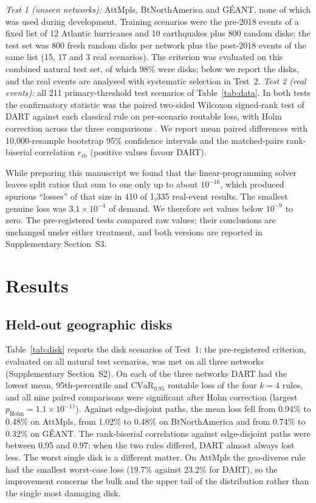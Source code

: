 \documentclass[preprint,12pt]{elsarticle}
\begin{document}
\emph{Test 1 (unseen networks):} AttMpls, BtNorthAmerica and G\'EANT, none of which was used during development. Training scenarios were the pre-2018 events of a fixed list of 12 Atlantic hurricanes and 10 earthquakes plus 800 random disks; the test set was 800 fresh random disks per network plus the post-2018 events of the same list (15, 17 and 3 real scenarios). The criterion was evaluated on this combined natural test set, of which 98\% were disks; below we report the disks, and the real events are analysed with systematic selection in Test~2. \emph{Test 2 (real events):} all 211 primary-threshold test scenarios of Table~\ref{tab:data}. In both tests the confirmatory statistic was the paired two-sided Wilcoxon signed-rank test \cite{wilcoxon45} of DART against each classical rule on per-scenario routable loss, with Holm correction across the three comparisons \cite{holm79}. We report mean paired differences with 10{,}000-resample bootstrap 95\% confidence intervals and the matched-pairs rank-biserial correlation $r_{\mathrm{rb}}$ (positive values favour DART).

While preparing this manuscript we found that the linear-programming solver leaves split ratios that sum to one only up to about $10^{-16}$, which produced spurious ``losses'' of that size in 410 of 1{,}335 real-event results. The smallest genuine loss was $3.1\times10^{-4}$ of demand. We therefore set values below $10^{-9}$ to zero. The pre-registered tests compared raw values; their conclusions are unchanged under either treatment, and both versions are reported in Supplementary Section~S3.

\section{Results}
\label{sec:results}

\subsection{Held-out geographic disks}

Table~\ref{tab:disk} reports the disk scenarios of Test~1; the pre-registered criterion, evaluated on all natural test scenarios, was met on all three networks (Supplementary Section~S2). On each of the three networks DART had the lowest mean, 95th-percentile and $\mathrm{CVaR}_{0.95}$ routable loss of the four $k=4$ rules, and all nine paired comparisons were significant after Holm correction (largest $p_{\mathrm{Holm}}=1.1\times10^{-11}$). Against edge-disjoint paths, the mean loss fell from 0.94\% to 0.48\% on AttMpls, from 1.02\% to 0.48\% on BtNorthAmerica and from 0.74\% to 0.32\% on G\'EANT. The rank-biserial correlations against edge-disjoint paths were between 0.95 and 0.97: when the two rules differed, DART almost always lost less. The worst single disk is a different matter. On AttMpls the geo-diverse rule had the smallest worst-case loss (19.7\% against 23.2\% for DART), so the improvement concerns the bulk and the upper tail of the distribution rather than the single most damaging disk.
\end{document}
